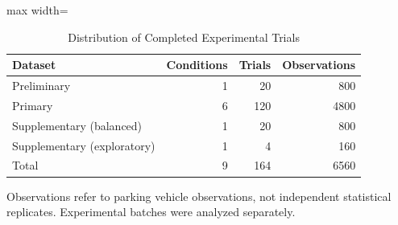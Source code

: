 \begin{table}[t]
\centering
\caption{Distribution of Completed Experimental Trials}
\label{tab:dataset_distribution}
\small
\setlength{\tabcolsep}{4pt}
\begin{adjustbox}{max width=\textwidth}

\begin{tabular}{lrrr}
\toprule
Dataset & Conditions & Trials & Observations\\
\midrule
Preliminary & 1 & 20 & 800\\
Primary & 6 & 120 & 4800\\
Supplementary (balanced) & 1 & 20 & 800\\
Supplementary (exploratory) & 1 & 4 & 160\\
Total & 9 & 164 & 6560\\
\bottomrule
\end{tabular}
\end{adjustbox}
\par\smallskip
\begin{minipage}{\textwidth}
\footnotesize
Observations refer to parking vehicle observations, not independent statistical replicates. Experimental batches were analyzed separately.
\end{minipage}
\end{table}
